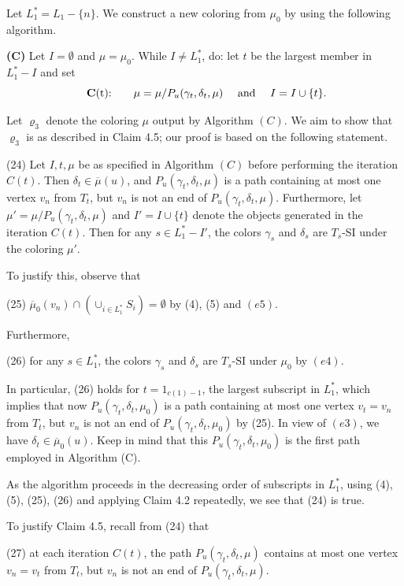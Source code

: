 \documentclass[11pt]{article}
\begin{document}
\vskip 2mm

Let $L_1^*= L_1 -\{n\}$. We construct a new coloring from $\mu_0$ by using the following algorithm.

{\flushleft \bf (C)} Let $I= \emptyset$ and $\mu  = \mu_0$. While $I \ne L_1^*$, do: let $t$ be the largest member in 
$L_1^* -I$ and set 
\[
\mbox{ {\bf C}(t):} \qquad \mu = \mu/P_u(\gamma_t, \delta_t, \mu) \quad \mbox{ and } \quad 
I = I\cup \{t\}.
\]

Let $\varrho_3$ denote the coloring $\mu$ output by Algorithm $(C)$. We aim to show that $\varrho_3$ is as described in
Claim 4.5; our proof is based on the following statement. 

(24) Let $I, t, \mu$ be as specified in Algorithm $(C)$ before performing the iteration $C(t)$. Then
$\delta_t \in \overline{\mu}(u)$, and $P_u(\gamma_t, \delta_t, \mu)$ is a path containing at most one vertex 
$v_n$ from $T_t$, but $v_n$ is not an end of $P_u(\gamma_t, \delta_t, \mu)$.  Furthermore, let $\mu'  = 
\mu/P_u(\gamma_t, \delta_t, \mu)$ and $I'= I\cup \{t\}$ denote the objects generated in the iteration 
$C(t)$. Then for any $s\in L_1^*-I'$, the colors $\gamma_s$ and $\delta_s$ are $T_s$-SI under the 
coloring $\mu'$. 

To justify this, observe that 

(25) $\overline{\mu}_0 (v_n) \cap (\cup_{i\in L_1^*} S_i)= \emptyset$ by (4), (5) and $(e5)$.

\noindent Furthermore, 

(26) for any $s\in L_1^*$, the colors $\gamma_s$ and $\delta_s$ are $T_s$-SI under $\mu_0$ by $(e4)$. 

\noindent In particular, (26) holds for $t=1_{c(1)-1}$, the largest subscript in $L^*_1$, which implies
that now $P_u(\gamma_t, \delta_t, \mu_0)$ is a path containing at most one vertex $v_t=v_n$ from $T_t$, 
but $v_n$ is not an end of $P_u(\gamma_t, \delta_t, \mu_0)$ by (25). In view of $(e3)$, we have $\delta_t \in 
\overline{\mu}_0(u)$. Keep in mind that this $P_u(\gamma_t, \delta_t, \mu_0)$ is the first path employed in
Algorithm (C).

As the algorithm proceeds in the decreasing order of subscripts in $L^*_1$, using (4), (5), (25), (26)
and applying Claim 4.2 repeatedly, we see that (24) is true.  

\vskip 2mm

To justify Claim 4.5, recall from (24) that 

(27) at each iteration $C(t)$, the path $P_u(\gamma_t, \delta_t, \mu)$ contains at most one vertex $v_n=v_t$ from 
$T_t$, but $v_n$ is not an end of $P_u(\gamma_t, \delta_t, \mu)$. 
\end{document}
